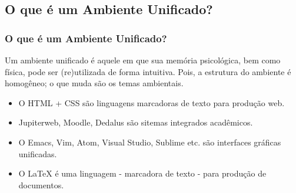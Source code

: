 \documentclass{beamer}
\begin{document}
\begin{frame}

  \section{O que é um Ambiente Unificado?}
  \frametitle{
    {\textcolor{yellow!70!black}{ {\LARGE {}}} %
      \textcolor{red!70!black}{O que é um Ambiente Unificado?}}} %
  \pause
  \begin{tcolorbox}[colback=blue!5!white, colframe=violet!65!white,
    title={\sc{\bf{Definição}}}]
    Um \alert{ambiente unificado} é aquele em que sua memória psicológica, bem como
    física, pode ser (re)utilizada de forma intuitiva. Pois, a estrutura do ambiente é
    homogêneo; o que muda são os temas ambientais.
  \end{tcolorbox}
  \pause







  \begin{tcolorbox}[colback=red!5!white,colframe=red!70!white,title=Exemplos]
    \begin{itemize}

    \item[{\textcolor{red!10!white}{\ding{166}}}] O HTML + CSS são linguagens marcadoras de texto para produção web.
      \pause

    \item[{\textcolor{red!30!white}{\ding{166}}}] Jupiterweb, Moodle, Dedalus são sitemas integrados acadêmicos.
      \pause
    \item[{\textcolor{red!50!white}{\ding{166}}}] O Emacs, Vim, Atom, Visual Studio, Sublime etc. são interfaces gráficas unificadas.
      \pause
    \item[{\textcolor{red!70!white}{\ding{166}}}] O \alert{\LaTeX} é uma linguagem - marcadora de texto - para produção de documentos.
    \end{itemize}
  \end{tcolorbox}




\end{frame}
\end{document}
